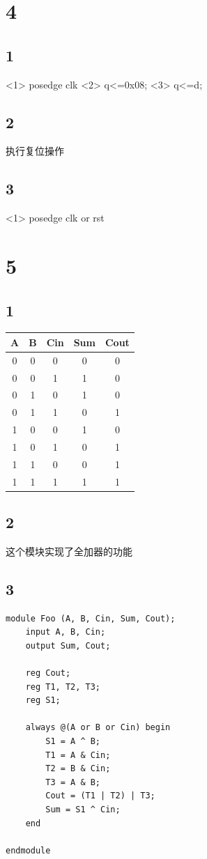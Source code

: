\documentclass[12pt,a4paper]{ctexart}
\begin{document}
\section*{4}
\subsection*{1}
<1> posedge clk
<2> q<=0x08;
<3> q<=d;
\subsection*{2}
执行复位操作
\subsection*{3}
<1> posedge clk or rst
\section*{5}
\subsection*{1}
\begin{tabular}{|c|c|c|c|c|}
    \hline
    A & B & Cin & Sum & Cout \\
    \hline
    0 & 0 & 0   & 0   & 0    \\
    \hline
    0 & 0 & 1   & 1   & 0    \\
    \hline
    0 & 1 & 0   & 1   & 0    \\
    \hline
    0 & 1 & 1   & 0   & 1    \\
    \hline
    1 & 0 & 0   & 1   & 0    \\
    \hline
    1 & 0 & 1   & 0   & 1    \\
    \hline
    1 & 1 & 0   & 0   & 1    \\
    \hline
    1 & 1 & 1   & 1   & 1    \\
    \hline
    \end{tabular}
\subsection*{2}
这个模块实现了全加器的功能
\subsection*{3}
\begin{lstlisting}[style=verilog]
module Foo (A, B, Cin, Sum, Cout);
    input A, B, Cin;
    output Sum, Cout;

    reg Cout;
    reg T1, T2, T3;
    reg S1;

    always @(A or B or Cin) begin
        S1 = A ^ B;
        T1 = A & Cin;
        T2 = B & Cin;
        T3 = A & B;
        Cout = (T1 | T2) | T3;
        Sum = S1 ^ Cin;
    end
    
endmodule
\end{lstlisting}
\end{document}
